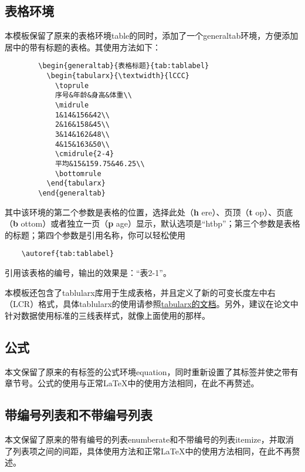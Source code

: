 \documentclass[UTF8,sub3section]{ctexart}
\begin{document}
	\subsection{表格环境}
	本模板保留了原来的表格环境table的同时，添加了一个generaltab环境，方便添加居中的带有标题的表格。其使用方法如下：
	\begin{verbatim}
		\begin{generaltab}{表格标题}{tab:tablabel}
		  \begin{tabularx}{\textwidth}{lCCC}
		    \toprule
		    序号&年龄&身高&体重\\
		    \midrule
		    1&14&156&42\\
		    2&16&158&45\\
		    3&14&162&48\\
		    4&15&163&50\\
		    \cmidrule{2-4}
		    平均&15&159.75&46.25\\
		    \bottomrule
		  \end{tabularx}
		\end{generaltab}
	\end{verbatim}
	其中该环境的第二个参数是表格的位置，选择此处（{\bfseries h} ere）、页顶（{\bfseries t} op）、页底（{\bfseries b} ottom）或者独立一页（{\bfseries p} age）显示\cite[\S 5.3]{9787121202087}，默认选项是“htbp”；第三个参数是表格的标题；第四个参数是引用名称，你可以轻松使用
	\begin{verbatim}
	\autoref{tab:tablabel}
	\end{verbatim}
	引用该表格的编号，输出的效果是：“表2-1”。
	
	本模板还包含了tablularx库用于生成表格，并且定义了新的可变长度左中右（LCR）格式，具体tablularx的使用请参照\href{http://mirror.lzu.edu.cn/CTAN/macros/latex/required/tools/tabularx.pdf}{tabularx的文档}。另外，建议在论文中针对数据使用标准的三线表样式，就像上面使用的那样。
	
	\subsection{公式}
	本文保留了原来的有标签的公式环境equation，同时重新设置了其标签并使之带有章节号。公式的使用与正常\LaTeX 中的使用方法相同，在此不再赘述。
	
	\subsection{带编号列表和不带编号列表}
	本文保留了原来的带有编号的列表enumberate和不带编号的列表itemize，并取消了列表项之间的间距，具体使用方法和正常\LaTeX 中的使用方法相同，在此不再赘述。
	
\end{document}
